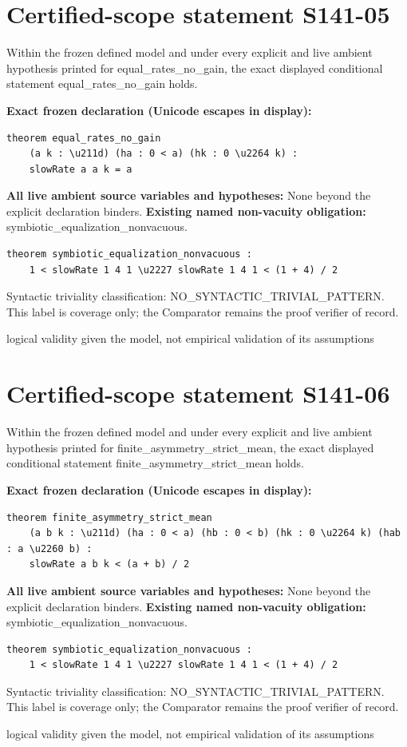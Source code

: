 \documentclass[11pt]{article}
\begin{document}
\section*{Certified-scope statement S141-05}
Within the frozen defined model and under every explicit and live ambient hypothesis printed for equal\_rates\_no\_gain, the exact displayed conditional statement equal\_rates\_no\_gain holds.
\par\noindent\textbf{Exact frozen declaration (Unicode escapes in display):}
\begin{verbatim}
theorem equal_rates_no_gain
    (a k : \u211d) (ha : 0 < a) (hk : 0 \u2264 k) :
    slowRate a a k = a
\end{verbatim}
\noindent\textbf{All live ambient source variables and hypotheses:}
None beyond the explicit declaration binders.
\noindent\textbf{Existing named non-vacuity obligation:} symbiotic\_equalization\_nonvacuous.
\begin{verbatim}
theorem symbiotic_equalization_nonvacuous :
    1 < slowRate 1 4 1 \u2227 slowRate 1 4 1 < (1 + 4) / 2
\end{verbatim}
\noindent Syntactic triviality classification: NO\_SYNTACTIC\_TRIVIAL\_PATTERN. This label is coverage only; the Comparator remains the proof verifier of record.
\par\noindent logical validity given the model, not empirical validation of its assumptions
\section*{Certified-scope statement S141-06}
Within the frozen defined model and under every explicit and live ambient hypothesis printed for finite\_asymmetry\_strict\_mean, the exact displayed conditional statement finite\_asymmetry\_strict\_mean holds.
\par\noindent\textbf{Exact frozen declaration (Unicode escapes in display):}
\begin{verbatim}
theorem finite_asymmetry_strict_mean
    (a b k : \u211d) (ha : 0 < a) (hb : 0 < b) (hk : 0 \u2264 k) (hab : a \u2260 b) :
    slowRate a b k < (a + b) / 2
\end{verbatim}
\noindent\textbf{All live ambient source variables and hypotheses:}
None beyond the explicit declaration binders.
\noindent\textbf{Existing named non-vacuity obligation:} symbiotic\_equalization\_nonvacuous.
\begin{verbatim}
theorem symbiotic_equalization_nonvacuous :
    1 < slowRate 1 4 1 \u2227 slowRate 1 4 1 < (1 + 4) / 2
\end{verbatim}
\noindent Syntactic triviality classification: NO\_SYNTACTIC\_TRIVIAL\_PATTERN. This label is coverage only; the Comparator remains the proof verifier of record.
\par\noindent logical validity given the model, not empirical validation of its assumptions
\end{document}
